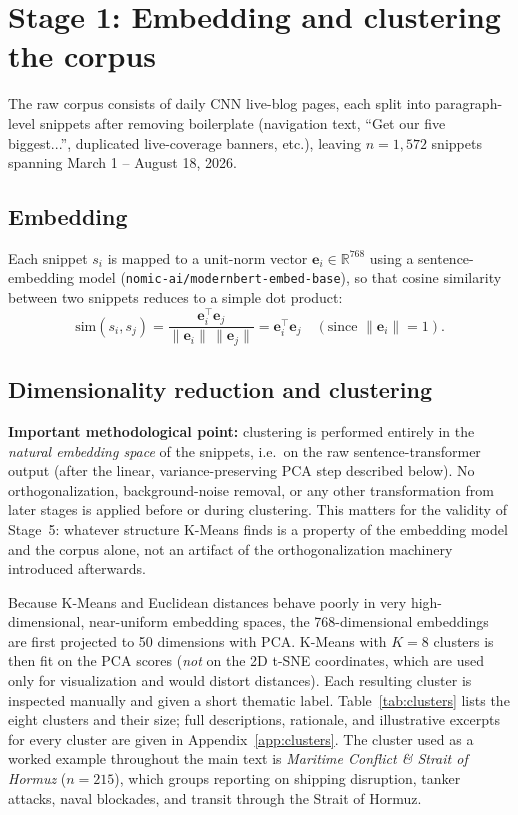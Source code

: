 \documentclass[11pt]{article}
\begin{document}
\section{Stage 1: Embedding and clustering the corpus}

The raw corpus consists of daily CNN live-blog pages, each split into
paragraph-level snippets after removing boilerplate (navigation text,
``Get our five biggest...'', duplicated live-coverage banners, etc.), leaving
$n = 1{,}572$ snippets spanning March 1 -- August 18, 2026.

\subsection{Embedding}
Each snippet $s_i$ is mapped to a unit-norm vector
$\mathbf{e}_i \in \mathbb{R}^{768}$ using a sentence-embedding model
(\texttt{nomic-ai/modernbert-embed-base}), so that cosine similarity between
two snippets reduces to a simple dot product:
\[
\text{sim}(s_i, s_j) = \frac{\mathbf{e}_i^\top \mathbf{e}_j}{\lVert \mathbf{e}_i\rVert\,\lVert \mathbf{e}_j\rVert} = \mathbf{e}_i^\top \mathbf{e}_j \quad (\text{since } \lVert \mathbf{e}_i\rVert = 1).
\]

\subsection{Dimensionality reduction and clustering}
\textbf{Important methodological point:} clustering is performed entirely in
the \emph{natural embedding space} of the snippets, i.e.\ on the raw
sentence-transformer output (after the linear, variance-preserving PCA step
described below). No orthogonalization, background-noise removal, or any
other transformation from later stages is applied before or during
clustering. This matters for the validity of Stage~5: whatever structure
K-Means finds is a property of the embedding model and the corpus alone,
not an artifact of the orthogonalization machinery introduced afterwards.

Because K-Means and Euclidean distances behave poorly in very
high-dimensional, near-uniform embedding spaces, the 768-dimensional
embeddings are first projected to 50 dimensions with PCA. K-Means with
$K=8$ clusters is then fit on the PCA scores (\emph{not} on the 2D t-SNE
coordinates, which are used only for visualization and would distort
distances). Each resulting cluster is inspected manually and given a
short thematic label. Table~\ref{tab:clusters} lists the eight clusters
and their size; full descriptions, rationale, and illustrative excerpts
for every cluster are given in Appendix~\ref{app:clusters}. The cluster
used as a worked example throughout the main text is
\textit{Maritime Conflict \& Strait of Hormuz} ($n=215$), which groups
reporting on shipping disruption, tanker attacks, naval blockades, and
transit through the Strait of Hormuz.
\end{document}
